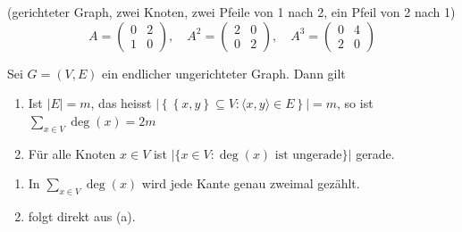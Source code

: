 \documentclass[12pt]{article}
\begin{document}
\begin{example}{}{}
    (gerichteter Graph, zwei Knoten, zwei Pfeile von 1 nach 2, ein Pfeil von 2 nach 1) $$
    A = \begin{pmatrix}
        0 & 2 \\
        1 & 0
    \end{pmatrix}, \quad A^2 = \begin{pmatrix}
        2 & 0 \\
        0 & 2
    \end{pmatrix}, \quad A^3 = \begin{pmatrix}
        0 & 4 \\
        2 & 0
    \end{pmatrix}
    $$
\end{example}

\begin{proposition}{}{}
    Sei $G = (V, E)$ ein endlicher ungerichteter Graph. Dann gilt
    \begin{enumerate}[label=\alph*)]
        \item Ist $|E| = m$, das heisst $|\left\{ \left\{x, y\right\} \subseteq V : \langle x, y \rangle \in E \right\}| = m$, so ist $\sum_{x \in V} \deg(x) = 2m$
        \item Für alle Knoten $x \in V$ ist $|\{x \in V : \deg(x) \text{ ist ungerade}\}|$ gerade.
    \end{enumerate}
\end{proposition}

\begin{proofbox}
    \begin{enumerate}[label=\alph*)]
        \item In $\sum_{x \in V} \deg(x)$ wird jede Kante genau zweimal gezählt.
        \item folgt direkt aus (a).
    \end{enumerate}
\end{proofbox}
\end{document}
